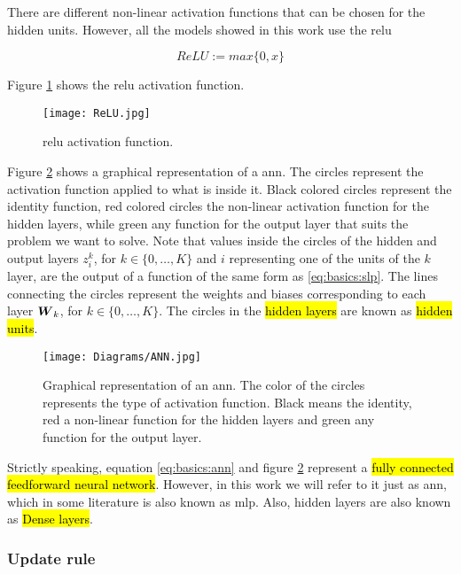 There are different non-linear activation functions that can be chosen for the hidden units. However, all the models showed in this work use the \gls{relu}

\begin{equation}
  ReLU := max\{0, x\}
\end{equation}

Figure \ref{fig:basics:ann:relu} shows the \gls{relu} activation function.

\begin{figure}[!ht]
  \centering
  \texttt{[image: ReLU.jpg]}
  \caption{\gls{relu} activation function.}
  \label{fig:basics:ann:relu}
\end{figure}

Figure \ref{fig:basics:ann:ann} shows a graphical representation of a \gls{ann}. The circles represent the activation function applied to what is inside it. Black colored circles represent the identity function, red colored circles the non-linear activation function for the hidden layers, while green any function for the output layer that suits the problem we want to solve. Note that values inside the circles of the hidden and output layers $z^k_i$, for $k\in\{0, \dots, K\}$ and $i$ representing one of the units of the $k$ layer, are the output of a function of the same form as \ref{eq:basics:slp}. The lines connecting the circles represent the weights and biases corresponding to each layer $\boldsymbol{W}_k$, for $k\in\{0, \dots, K\}$. The circles in the \hl{hidden layers} are known as \hl{hidden units}.

\begin{figure}[!ht]
  \centering
  \texttt{[image: Diagrams/ANN.jpg]}
  \caption{Graphical representation of an \gls{ann}. The color of the circles represents the type of activation function. Black means the identity, red a non-linear function for the hidden layers and green any function for the output layer.}
  \label{fig:basics:ann:ann}
\end{figure}

Strictly speaking, equation \ref{eq:basics:ann} and figure \ref{fig:basics:ann:ann} represent a \hl{fully connected feedforward neural network}. However, in this work we will refer to it just as \gls{ann}, which in some literature is also known as \gls{mlp}. Also, hidden layers are also known as \hl{Dense layers}.

\subsubsection{Update rule}

